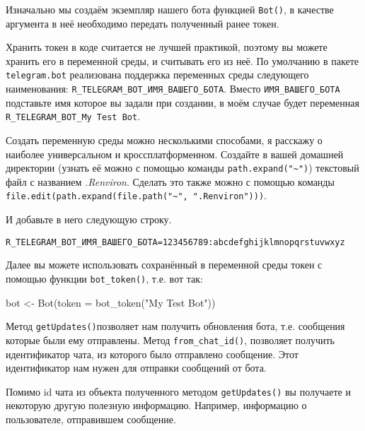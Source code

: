 \documentclass[
]{book}
\newenvironment{Shaded}{\begin{snugshade}}{\end{snugshade}}
\newcommand{\AttributeTok}[1]{\textcolor[rgb]{0.77,0.63,0.00}{#1}}
\newcommand{\FunctionTok}[1]{\textcolor[rgb]{0.00,0.00,0.00}{#1}}
\newcommand{\NormalTok}[1]{#1}
\newcommand{\OtherTok}[1]{\textcolor[rgb]{0.56,0.35,0.01}{#1}}
\newcommand{\SpecialCharTok}[1]{\textcolor[rgb]{0.00,0.00,0.00}{#1}}
\newcommand{\StringTok}[1]{\textcolor[rgb]{0.31,0.60,0.02}{#1}}
\begin{document}
Изначально мы создаём экземпляр нашего бота функцией \texttt{Bot()}, в качестве аргумента в неё необходимо передать полученный ранее токен.

Хранить токен в коде считается не лучшей практикой, поэтому вы можете хранить его в переменной среды, и считывать его из неё. По умолчанию в пакете \texttt{telegram.bot} реализована поддержка переменных среды следующего наименования: \texttt{R\_TELEGRAM\_BOT\_ИМЯ\_ВАШЕГО\_БОТА}. Вместо \texttt{ИМЯ\_ВАШЕГО\_БОТА} подставьте имя которое вы задали при создании, в моём случае будет переменная \texttt{R\_TELEGRAM\_BOT\_My\ Test\ Bot}.

Создать переменную среды можно несколькими способами, я расскажу о наиболее универсальном и кроссплатформенном. Создайте в вашей домашней директории (узнать её можно с помощью команды \texttt{path.expand("\textasciitilde{}")}) текстовый файл с названием \emph{.Renviron}. Сделать это также можно с помощью команды \texttt{file.edit(path.expand(file.path("\textasciitilde{}",\ ".Renviron")))}.

И добавьте в него следующую строку.

\begin{verbatim}
R_TELEGRAM_BOT_ИМЯ_ВАШЕГО_БОТА=123456789:abcdefghijklmnopqrstuvwxyz
\end{verbatim}

Далее вы можете использовать сохранённый в переменной среды токен с помощью функции \texttt{bot\_token()}, т.е. вот так:

\begin{Shaded}
\begin{Highlighting}[]
\NormalTok{bot }\OtherTok{\textless{}{-}} \FunctionTok{Bot}\NormalTok{(}\AttributeTok{token =} \FunctionTok{bot\_token}\NormalTok{(}\StringTok{"My Test Bot"}\NormalTok{))}
\end{Highlighting}
\end{Shaded}

Метод \texttt{getUpdates()}позволяет нам получить обновления бота, т.е. сообщения которые были ему отправлены. Метод \texttt{from\_chat\_id()}, позволяет получить идентификатор чата, из которого было отправлено сообщение. Этот идентификатор нам нужен для отправки сообщений от бота.

Помимо id чата из объекта полученного методом \texttt{getUpdates()} вы получаете и некоторую другую полезную информацию. Например, информацию о пользователе, отправившем сообщение.

\begin{Shaded}
\end{Shaded}
\end{document}
